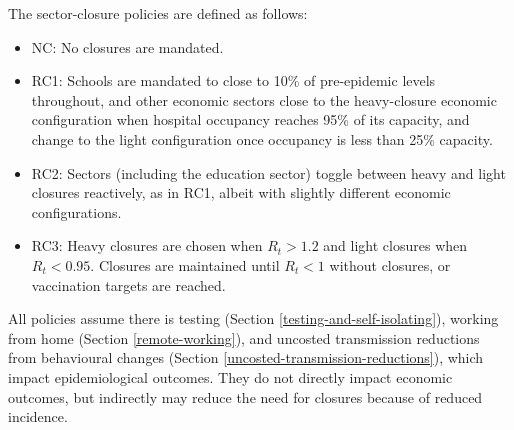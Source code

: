 \documentclass[
]{article}
\providecommand{\tightlist}{%
  \setlength{\itemsep}{0pt}\setlength{\parskip}{0pt}}
\begin{document}
The sector-closure policies are defined as follows:

\begin{itemize}
\tightlist
\item
  NC: No closures are mandated.
\item
  RC1: Schools are mandated to close to 10\% of pre-epidemic levels throughout, and other economic sectors close to the heavy-closure economic configuration when hospital occupancy reaches 95\% of its capacity, and change to the light configuration once occupancy is less than 25\% capacity.
\item
  RC2: Sectors (including the education sector) toggle between heavy and light closures reactively, as in RC1, albeit with slightly different economic configurations.
\item
  RC3: Heavy closures are chosen when \(R_t>1.2\) and light closures when \(R_t<0.95\). Closures are maintained until \(R_t<1\) without closures, or vaccination targets are reached.
\end{itemize}

All policies assume there is testing (Section \ref{testing-and-self-isolating}), working from home (Section \ref{remote-working}), and uncosted transmission reductions from behavioural changes (Section \ref{uncosted-transmission-reductions}), which impact epidemiological outcomes. They do not directly impact economic outcomes, but indirectly may reduce the need for closures because of reduced incidence.
\end{document}

